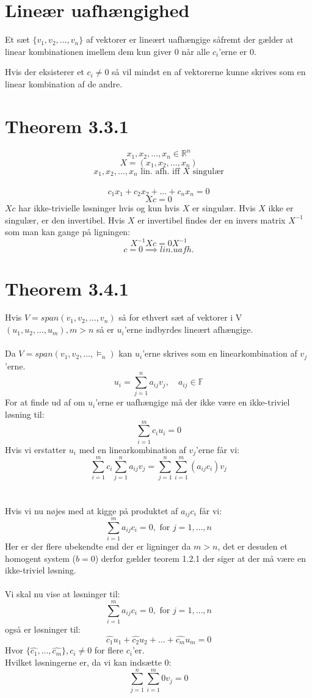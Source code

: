 \documentclass[a4paper,oneside,article]{memoir}
\begin{document}
    \section{Lineær uafhængighed}
    Et sæt $\{v_1,v_2,\dots,v_n\}$ af vektorer er lineært uafhængige såfremt der gælder at linear kombinationen imellem dem kun giver $0$ når alle $c_i$'erne er $0$.
    
    Hvis der eksisterer et $c_i\neq 0$ så vil mindst en af vektorerne kunne skrives som en linear kombination af de andre.
    
    \section{Theorem 3.3.1}
    $$x_1,x_2,\dots,x_n \in \mathbb{R}^n$$
    $$X=(x_1,x_2,\dots,x_n)$$
    $$x_1,x_2,\dots,x_n \text{ lin. afh. iff } X \text{ singulær}$$
    \\
    $$c_1x_1+c_2x_2+\dots+c_nx_n=0$$
    $$Xc=0$$
    $Xc$ har ikke-trivielle løsninger hvis og kun hvis 
    $X$ er singulær. Hvis $X$ ikke er singulær, er den
    invertibel. Hvis $X$ er invertibel findes der en 
    invers matrix $X^{-1}$ som man kan gange på ligningen:
    $$X^{-1}Xc=0X^{-1}$$
    $$c=0\implies lin. uafh.$$
    
    \section{Theorem 3.4.1}
  	 Hvis $V=span(v_1,v_2,\dots,v_n)$ så for ethvert sæt af vektorer 
  	 i V $(u_1,u_2,\dots,u_m), m>n$ så er $u_i$'erne indbyrdes
  	 lineært afhængige.
  	 \\
  	 \\
  	 Da $V=span(v_1,v_2,\dots,\vDash_n)$ kan $u_i$'erne skrives 
  	 som en linearkombination af $v_j$'erne.
  	 $$u_i=\sum\limits_{j=1}^{n}a_{ij}v_j, \quad a_{ij}\in \mathbb{F}$$
  	 For at finde ud af om $u_i$'erne er uafhængige må der ikke
  	 være en ikke-triviel løsning til:
  	 $$\sum\limits_{i=1}^{m}c_iu_i=0$$
  	 Hvis vi erstatter $u_i$ med en linearkombination af $v_j$'erne 
  	 får vi:
  	 $$\sum\limits_{i=1}^{m}c_i\sum\limits_{j=1}^{n}a_{ij}v_j=
  	 \sum\limits_{j=1}^{n}\sum\limits_{i=1}^{m}(a_{ij}c_i)v_j$$
  	 \\
  	 \\
  	 Hvis vi nu nøjes med at kigge på produktet af $a_{ij}c_i$
  	 får vi:
  	 $$\sum\limits_{i=1}^{m}a_{ij}c_i=0,\text{ for } j=1,\dots,n$$
  	 Her er der flere ubekendte end der er ligninger da $m>n$,
  	 det er desuden et homogent system ($b=0$) derfor gælder
  	 teorem 1.2.1 der siger at der må være en ikke-triviel
  	 løsning.
  	 \\
  	 \\
  	 Vi skal nu vise at løsninger til:
  	 $$\sum\limits_{i=1}^{m}a_{ij}c_i=0,\text{ for } j=1,\dots,n$$
  	 også er løsninger til:
  	 $$\hat{c_1}u_1+\hat{c_2}u_2+\dots+\hat{c_m}u_m=0$$
  	 Hvor $\{\hat{c_1},\dots,\hat{c_m}\}, c_i \neq 0$ for flere 
  	 $c_i$'er.\\
  	 Hvilket løsningerne er, da vi kan indsætte 0:
  	 $$\sum\limits_{j=1}^{n}\sum\limits_{i=1}^{m}0v_j=0$$
    
\end{document}
